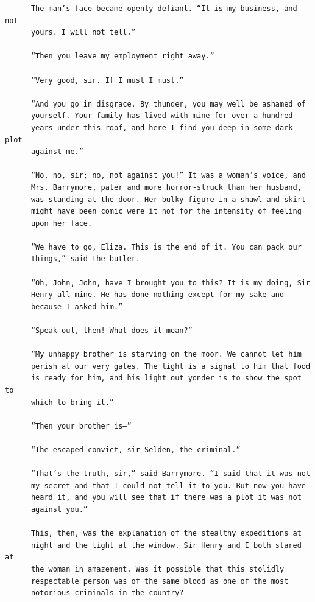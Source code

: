 \documentclass{article}
\begin{document}
\begin{verbatim}
      The man’s face became openly defiant. “It is my business, and not
      yours. I will not tell.”

      “Then you leave my employment right away.”

      “Very good, sir. If I must I must.”

      “And you go in disgrace. By thunder, you may well be ashamed of
      yourself. Your family has lived with mine for over a hundred
      years under this roof, and here I find you deep in some dark plot
      against me.”

      “No, no, sir; no, not against you!” It was a woman’s voice, and
      Mrs. Barrymore, paler and more horror-struck than her husband,
      was standing at the door. Her bulky figure in a shawl and skirt
      might have been comic were it not for the intensity of feeling
      upon her face.

      “We have to go, Eliza. This is the end of it. You can pack our
      things,” said the butler.

      “Oh, John, John, have I brought you to this? It is my doing, Sir
      Henry—all mine. He has done nothing except for my sake and
      because I asked him.”

      “Speak out, then! What does it mean?”

      “My unhappy brother is starving on the moor. We cannot let him
      perish at our very gates. The light is a signal to him that food
      is ready for him, and his light out yonder is to show the spot to
      which to bring it.”

      “Then your brother is—”

      “The escaped convict, sir—Selden, the criminal.”

      “That’s the truth, sir,” said Barrymore. “I said that it was not
      my secret and that I could not tell it to you. But now you have
      heard it, and you will see that if there was a plot it was not
      against you.”

      This, then, was the explanation of the stealthy expeditions at
      night and the light at the window. Sir Henry and I both stared at
      the woman in amazement. Was it possible that this stolidly
      respectable person was of the same blood as one of the most
      notorious criminals in the country?


\end{verbatim}
\end{document}
